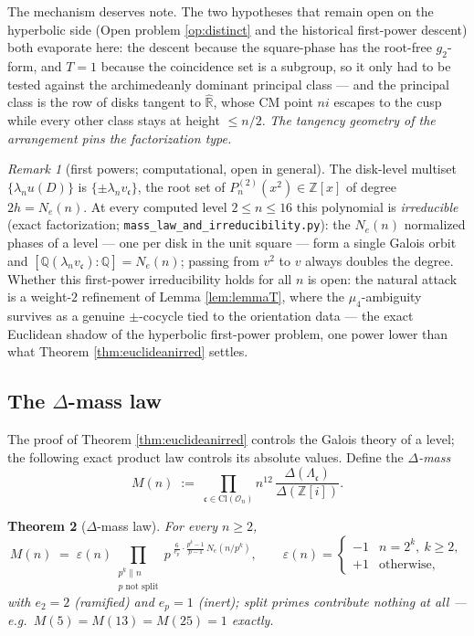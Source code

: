 \documentclass[11pt]{amsart}
\numberwithin{equation}{section}
\theoremstyle{plain}
\newtheorem{theorem}{Theorem}[section]
\theoremstyle{definition}
\theoremstyle{remark}
\newtheorem{remark}[theorem]{Remark}
\newcommand{\R}{\mathbb{R}}
\newcommand{\Q}{\mathbb{Q}}
\newcommand{\Z}{\mathbb{Z}}
\newcommand{\Zi}{\Z[i]}
\newcommand{\Rhat}{\widehat{\R}}
\newcommand{\Cl}{\mathrm{Cl}}
\newcommand{\idealc}{\mathfrak{c}}
\begin{document}
The mechanism deserves note.  The two hypotheses that remain open on
the hyperbolic side (Open problem \ref{op:distinct} and the historical
first-power descent) both evaporate here: the descent because the
square-phase has the root-free $g_2$-form, and $T = 1$ because the
coincidence set is a subgroup, so it only had to be tested against the
archimedeanly dominant principal class --- and the principal class is
the row of disks tangent to $\Rhat$, whose CM point $ni$ escapes to
the cusp while every other class stays at height $\le n/2$.  \emph{The
tangency geometry of the arrangement pins the factorization type.}

\begin{remark}[first powers; computational, open in general]
\label{rem:eucfirstpower}
The disk-level multiset $\{\lambda_nu(D)\}$ is $\{\pm\lambda_n
v_{\idealc}\}$, the root set of $P^{(2)}_n(x^2) \in \Z[x]$ of degree
$2h = N_e(n)$.  At every computed level $2 \le n \le 16$ this
polynomial is \emph{irreducible} (exact factorization;
\texttt{mass\_law\_and\_irreducibility.py}): the $N_e(n)$ normalized
phases of a level --- one per disk in the unit square --- form a
single Galois orbit and $[\Q(\lambda_nv_{\idealc}) : \Q] = N_e(n)$;
passing from $v^2$ to $v$ always doubles the degree.  Whether this
first-power irreducibility holds for all $n$ is open: the natural
attack is a weight-$2$ refinement of Lemma \ref{lem:lemmaT}, where the
$\mu_4$-ambiguity survives as a genuine $\pm$-cocycle tied to the
orientation data --- the exact Euclidean shadow of the hyperbolic
first-power problem, one power lower than what Theorem
\ref{thm:euclideanirred} settles.
\end{remark}

\subsection{The $\Delta$-mass law}\label{subsec:massa}

The proof of Theorem \ref{thm:euclideanirred} controls the Galois
theory of a level; the following exact product law controls its
absolute values.  Define the \emph{$\Delta$-mass}
\[
  M(n) \;:=\; \prod_{\idealc \in \Cl(\mathcal{O}_n)}
  n^{12}\,\frac{\Delta(\Lambda_{\idealc})}{\Delta(\Zi)} .
\]

\begin{theorem}[$\Delta$-mass law]\label{thm:massa}
For every $n \ge 2$,
\[
  M(n) \;=\; \varepsilon(n)\prod_{\substack{p^k \parallel n\\ p
  \text{ not split}}} p^{\;\frac{6}{e_p}\cdot\frac{p^k - 1}{p - 1}\,
  N_e(n/p^k)},
  \qquad
  \varepsilon(n) = \begin{cases} -1 & n = 2^k,\ k \ge 2,\\ +1 &
  \text{otherwise,}\end{cases}
\]
with $e_2 = 2$ (ramified) and $e_p = 1$ (inert); split primes
contribute nothing at all --- e.g.\ $M(5) = M(13) = M(25) = 1$
exactly.
\end{theorem}
\end{document}
